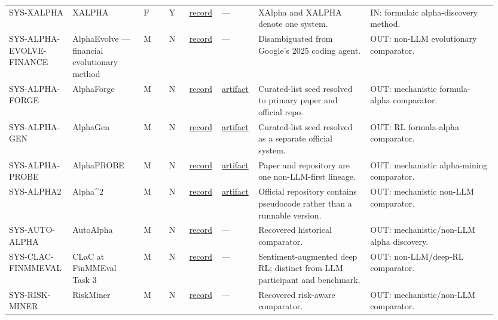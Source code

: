 \begin{longtable}{@{}L{0.12\linewidth}L{0.14\linewidth}L{0.05\linewidth}L{0.04\linewidth}L{0.06\linewidth}L{0.07\linewidth}L{0.22\linewidth}L{0.25\linewidth}@{}}
SYS-\allowbreak{}XALPHA & XALPHA & F & Y & \href{https://arxiv.org/abs/2607.08332}{record} & --- & XAlpha and XALPHA denote one system. & IN: formulaic alpha-discovery method. \\
SYS-\allowbreak{}ALPHA-\allowbreak{}EVOLVE-\allowbreak{}FINANCE & AlphaEvolve — financial evolutionary method & M & N & \href{https://arxiv.org/abs/2103.16196}{record} & --- & Disambiguated from Google's 2025 coding agent. & OUT: non-LLM evolutionary comparator. \\
SYS-\allowbreak{}ALPHA-\allowbreak{}FORGE & AlphaForge & M & N & \href{https://arxiv.org/abs/2406.18394}{record} & \href{https://github.com/DulyHao/AlphaForge}{artifact} & Curated-list seed resolved to primary paper and official repo. & OUT: mechanistic formula-alpha comparator. \\
SYS-\allowbreak{}ALPHA-\allowbreak{}GEN & AlphaGen & M & N & \href{https://doi.org/10.1145/3580305.3599831}{record} & \href{https://github.com/RL-MLDM/alphagen}{artifact} & Curated-list seed resolved as a separate official system. & OUT: RL formula-alpha comparator. \\
SYS-\allowbreak{}ALPHA-\allowbreak{}PROBE & AlphaPROBE & M & N & \href{https://arxiv.org/abs/2602.11917}{record} & \href{https://github.com/gta0804/AlphaPROBE}{artifact} & Paper and repository are one non-LLM-first lineage. & OUT: mechanistic alpha-mining comparator. \\
SYS-\allowbreak{}ALPHA2 & Alpha\textasciicircum{}2 & M & N & \href{https://arxiv.org/abs/2406.16505}{record} & \href{https://github.com/x35f/alpha2}{artifact} & Official repository contains pseudocode rather than a runnable version. & OUT: mechanistic non-LLM comparator. \\
SYS-\allowbreak{}AUTO-\allowbreak{}ALPHA & AutoAlpha & M & N & \href{https://arxiv.org/abs/2002.08245}{record} & --- & Recovered historical comparator. & OUT: mechanistic/non-LLM alpha discovery. \\
SYS-\allowbreak{}CLAC-\allowbreak{}FINMMEVAL & CLaC at FinMMEval Task 3 & M & N & \href{https://arxiv.org/abs/2607.16028}{record} & --- & Sentiment-augmented deep RL; distinct from LLM participant and benchmark. & OUT: non-LLM/deep-RL comparator. \\
SYS-\allowbreak{}RISK-\allowbreak{}MINER & RiskMiner & M & N & \href{https://arxiv.org/abs/2402.07080}{record} & --- & Recovered risk-aware comparator. & OUT: mechanistic/non-LLM comparator. \\

\end{longtable}
